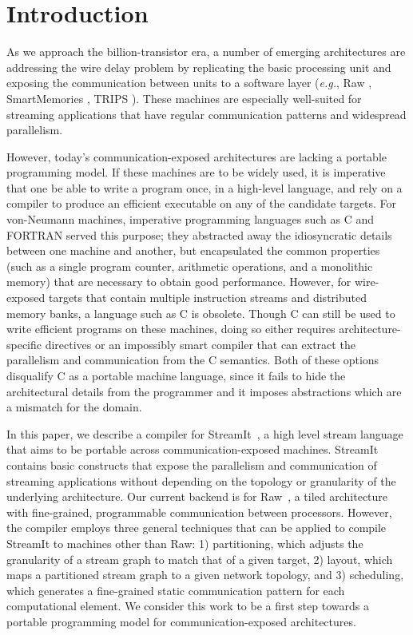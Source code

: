 \section{Introduction}

As we approach the billion-transistor era, a number of emerging
architectures are addressing the wire delay problem by replicating the
basic processing unit and exposing the communication between units to
a software layer ({\it e.g.}, Raw \cite{raw}, SmartMemories
\cite{smartmemories}, TRIPS \cite{trips}).  These machines are
especially well-suited for streaming applications that have regular
communication patterns and widespread parallelism.

However, today's communication-exposed architectures are lacking a
portable programming model.  If these machines are to be widely used,
it is imperative that one be able to write a program once, in a
high-level language, and rely on a compiler to produce an efficient
executable on any of the candidate targets. For von-Neumann machines,
imperative programming languages such as C and FORTRAN served this
purpose; they abstracted away the idiosyncratic details between one
machine and another, but encapsulated the common properties (such as a
single program counter, arithmetic operations, and a monolithic
memory) that are necessary to obtain good performance.  However, for
wire-exposed targets that contain multiple instruction streams and
distributed memory banks, a language such as C is obsolete.  Though C
can still be used to write efficient programs on these machines, doing
so either requires architecture-specific directives or an impossibly
smart compiler that can extract the parallelism and communication from
the C semantics.  Both of these options disqualify C as a portable
machine language, since it fails to hide the architectural details
from the programmer and it imposes abstractions which are a mismatch
for the domain.

In this paper, we describe a compiler for StreamIt~\cite{streamitcc},
a high level stream language that aims to be portable across
communication-exposed machines.  StreamIt contains basic constructs
that expose the parallelism and communication of streaming
applications without depending on the topology or granularity of the
underlying architecture.  Our current backend is for Raw~\cite{raw}, a
tiled architecture with fine-grained, programmable communication
between processors.  However, the compiler employs three general
techniques that can be applied to compile StreamIt to machines other
than Raw: 1) partitioning, which adjusts the granularity of a stream
graph to match that of a given target, 2) layout, which maps a
partitioned stream graph to a given network topology, and 3)
scheduling, which generates a fine-grained static communication
pattern for each computational element.  We consider this work to be a
first step towards a portable programming model for
communication-exposed architectures.

